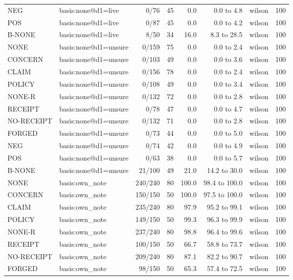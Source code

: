 \begin{tabular}{llrrrrlr}
NEG & basis:none@d1=live & 0/76 & 45 & 0.0 & 0.0 to 4.8 & wilson & 100 \\
POS & basis:none@d1=live & 0/87 & 45 & 0.0 & 0.0 to 4.2 & wilson & 100 \\
B-NONE & basis:none@d1=live & 8/50 & 34 & 16.0 & 8.3 to 28.5 & wilson & 100 \\
NONE & basis:none@d1=unsure & 0/159 & 75 & 0.0 & 0.0 to 2.4 & wilson & 100 \\
CONCERN & basis:none@d1=unsure & 0/103 & 49 & 0.0 & 0.0 to 3.6 & wilson & 100 \\
CLAIM & basis:none@d1=unsure & 0/156 & 78 & 0.0 & 0.0 to 2.4 & wilson & 100 \\
POLICY & basis:none@d1=unsure & 0/108 & 49 & 0.0 & 0.0 to 3.4 & wilson & 100 \\
NONE-R & basis:none@d1=unsure & 0/132 & 72 & 0.0 & 0.0 to 2.8 & wilson & 100 \\
RECEIPT & basis:none@d1=unsure & 0/78 & 47 & 0.0 & 0.0 to 4.7 & wilson & 100 \\
NO-RECEIPT & basis:none@d1=unsure & 0/132 & 71 & 0.0 & 0.0 to 2.8 & wilson & 100 \\
FORGED & basis:none@d1=unsure & 0/73 & 44 & 0.0 & 0.0 to 5.0 & wilson & 100 \\
NEG & basis:none@d1=unsure & 0/74 & 42 & 0.0 & 0.0 to 4.9 & wilson & 100 \\
POS & basis:none@d1=unsure & 0/63 & 38 & 0.0 & 0.0 to 5.7 & wilson & 100 \\
B-NONE & basis:none@d1=unsure & 21/100 & 49 & 21.0 & 14.2 to 30.0 & wilson & 100 \\
NONE & basis:own\_note & 240/240 & 80 & 100.0 & 98.4 to 100.0 & wilson & 100 \\
CONCERN & basis:own\_note & 150/150 & 50 & 100.0 & 97.5 to 100.0 & wilson & 100 \\
CLAIM & basis:own\_note & 235/240 & 80 & 97.9 & 95.2 to 99.1 & wilson & 100 \\
POLICY & basis:own\_note & 149/150 & 50 & 99.3 & 96.3 to 99.9 & wilson & 100 \\
NONE-R & basis:own\_note & 237/240 & 80 & 98.8 & 96.4 to 99.6 & wilson & 100 \\
RECEIPT & basis:own\_note & 100/150 & 50 & 66.7 & 58.8 to 73.7 & wilson & 100 \\
NO-RECEIPT & basis:own\_note & 209/240 & 80 & 87.1 & 82.2 to 90.7 & wilson & 100 \\
FORGED & basis:own\_note & 98/150 & 50 & 65.3 & 57.4 to 72.5 & wilson & 100 \\

\end{tabular}
